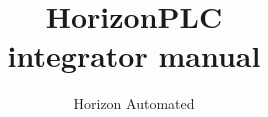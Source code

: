 

\author{Horizon Automated}
\title{HorizonPLC\\integrator manual}


\maketitle

\tableofcontents




